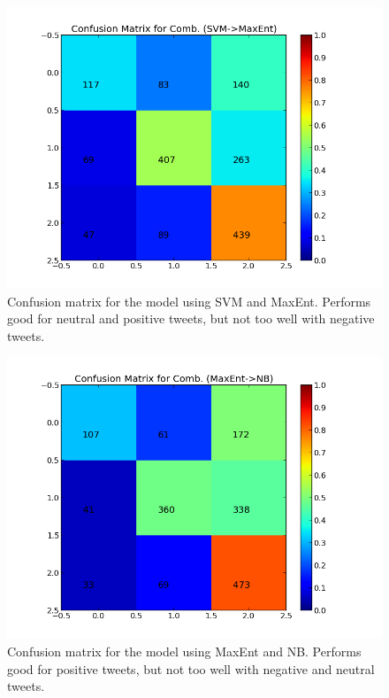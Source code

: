 \begin{minipage}[s]{\linewidth}
     \begin{minipage}{0.45\linewidth}
          \begin{figure}[H]
               \includegraphics[width=\linewidth]{../img/plots/grid/confusion_matrix_Comb-SVM-MaxEnt.png}
           \caption[Plot showing the confusion matrix for two-step SVM -> MaxEnt]{Confusion matrix for the model using SVM and MaxEnt. Performs good for neutral and positive tweets, but not too well with negative tweets.}
           \label{fig:confmat_svm_maxent}
          \end{figure}
     \end{minipage}
     \hspace{0.05\linewidth}
     \begin{minipage}{0.45\linewidth}
          \begin{figure}[H]
               \includegraphics[width=\linewidth]{../img/plots/grid/confusion_matrix_Comb-MaxEnt-NB.png}
           \caption[Plot showing the confusion matrix for two-step MaxEnt -> NB]{Confusion matrix for the model using MaxEnt and NB. Performs good for positive tweets, but not too well with negative and neutral tweets.}
           \label{fig:confmat_maxent_nb}
          \end{figure}
     \end{minipage}   \\
         


\end{minipage}
